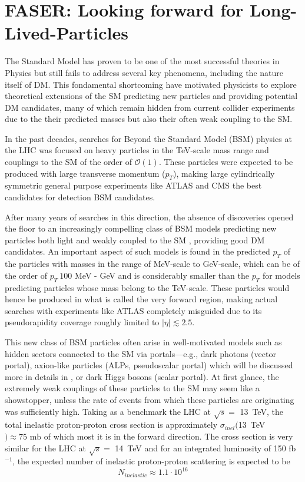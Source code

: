 \chapter{FASER: Looking forward for Long-Lived-Particles}
	The Standard Model has proven to be one of the most successful theories in Physics but still fails to address several key phenomena, including the nature itself of DM. This fondamental shortcoming have motivated physicists to explore theoretical extensions of the SM predicting new particles and providing potential DM candidates, many of which remain hidden from current collider experiments due to the their predicted masses but also their often weak coupling to the SM. 

	In the past decades, searches for Beyond the Standard Model (BSM) physics at the LHC was focused on heavy particles in the TeV-scale mass range and couplings to the SM of the order of $\mathcal{O}(1)$. These particles were expected to be produced with large transverse momentum ($p_T$), making large cylindrically symmetric general purpose experiments like ATLAS \cite{atlas_detector} and CMS \cite{cms_detector} the best candidates for detection BSM candidates. 
	
	After many years of searches in this direction, the absence of discoveries opened the floor to an increasingly compelling class of BSM models predicting new particles both light and weakly coupled to the SM \cite{FASER_LLP}, providing good DM candidates. An important aspect of such models is found in the predicted $p_T$ of the particles with masses in the range of MeV-scale to GeV-scale, which can be of the order of $p_T ~ 100$ MeV - GeV and is considerably smaller than the $p_T$ for models predicting particles whose mass belong to the TeV-scale. These particles would hence be produced in what is called the very forward region, making actual searches with experiments like ATLAS completely misguided due to its pseudorapidity coverage roughly limited to $|\eta| \lesssim 2.5$.
	
	This new class of BSM particles often arise in well-motivated models such as hidden sectors connected to the SM via portals—e.g., dark photons (vector portal), axion-like particles (ALPs, pseudoscalar portal) which will be discussed more in details in , or dark Higgs bosons (scalar portal). At first glance, the extremely weak couplings of these particles to the SM may seem like a showstopper, unless the rate of events from which these particles are originating was sufficiently high. Taking as a benchmark the LHC at $\sqrt{s} =$ \SI{13}{\tera\electronvolt}, the total inelastic proton-proton cross section is approximately $\sigma_{inel}($\SI{13}{\tera\electronvolt}$) \approx 75 \text{ mb}$ \cite{inelastic_XS_ATLAS} of which most it is in the forward direction. The cross section is very similar for the LHC at $\sqrt{s} =$ \SI{14}{\tera\electronvolt} and for an integrated luminosity of 150 fb$^{-1}$, the expected number of inelastic proton-proton scattering is expected to be
	\begin{equation}
		N_{inelastic} \approx 1.1 \cdot 10^{16}
	\end{equation} 

